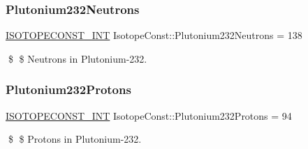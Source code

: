\subsubsection{\texorpdfstring{Plutonium232\+Neutrons}{Plutonium232Neutrons}}
{\footnotesize\ttfamily \mbox{\hyperlink{group___isotope_const-_macros_ga5f18360b3e99483a35c32d789e62621c}{I\+S\+O\+T\+O\+P\+E\+C\+O\+N\+S\+T\+\_\+\+I\+NT}} Isotope\+Const\+::\+Plutonium232\+Neutrons = 138}

\$ \$ Neutrons in Plutonium-\/232. \mbox{\label{group___isotope_const-_plutonium-_pu232_gae7b61ffa2d38076a6dd42fc1abdcec74}} 
\subsubsection{\texorpdfstring{Plutonium232\+Protons}{Plutonium232Protons}}
{\footnotesize\ttfamily \mbox{\hyperlink{group___isotope_const-_macros_ga5f18360b3e99483a35c32d789e62621c}{I\+S\+O\+T\+O\+P\+E\+C\+O\+N\+S\+T\+\_\+\+I\+NT}} Isotope\+Const\+::\+Plutonium232\+Protons = 94}

\$ \$ Protons in Plutonium-\/232. 
